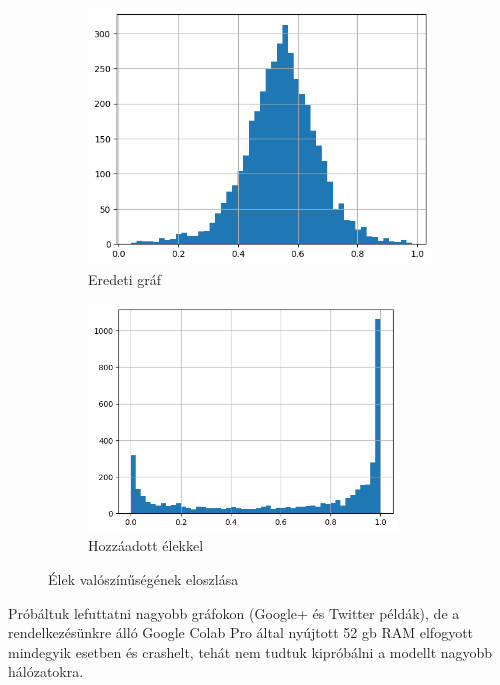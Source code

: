 \documentclass{article}
\begin{document}
		\begin{figure}[H]
			\centering
			\begin{subfigure}[H]{0.49\textwidth}
				\centering
				\includegraphics[width=.9\textwidth]{Figures/few_edges.png}
				\caption{Eredeti gráf}
			\end{subfigure}
			\begin{subfigure}[H]{0.49\textwidth}
				\centering
				\includegraphics[width=0.9\textwidth]{Figures/many_edges.png}
				\caption{Hozzáadott élekkel}
			\end{subfigure}
			\caption{Élek valószínűségének eloszlása}
		\end{figure}
		
		\par Próbáltuk lefuttatni nagyobb gráfokon (Google+ és Twitter példák), de a rendelkezésünkre álló Google Colab Pro által nyújtott 52 gb RAM elfogyott mindegyik esetben és crashelt, tehát nem tudtuk kipróbálni a modellt nagyobb hálózatokra.
\end{document}
